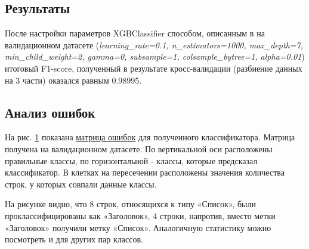 \documentclass{ProcISPRAS}
\begin{document}
\subsection{Результаты}

После настройки параметров XGBClassifier способом, описанным в \cite{tuning} на валидационном датасете (\textit{learning\_rate=0.1, n\_estimators=1000, max\_depth=7, min\_child\_weight=2, gamma=0, subsample=1, colsample\_bytree=1, alpha=0.01}) итоговый F1-score, полученный в результате кросс-валидации (разбиение данных на 3 части) оказался равным 0.98995. 

\subsection{Анализ ошибок}

На рис. \ref{fig:confusion_matrix} показана \href{https://en.wikipedia.org/wiki/Confusion_matrix}{матрица ошибок} для полученного классификатора. Матрица получена на валидационном датасете. По вертикальной оси расположены правильные классы, по горизонтальной - классы, которые предсказал классификатор. В клетках на пересечении расположены значения количества строк, у которых совпали данные классы.

\begin{figure}[ht]
    \label{fig:confusion_matrix}
\end{figure}

На рисунке видно, что 8 строк, относящихся к типу «Список», были проклассифицированы как «Заголовок», 4 строки, напротив, вместо метки «Заголовок» получили метку «Список». Аналогичную статистику можно посмотреть и для других пар классов.
\end{document}
